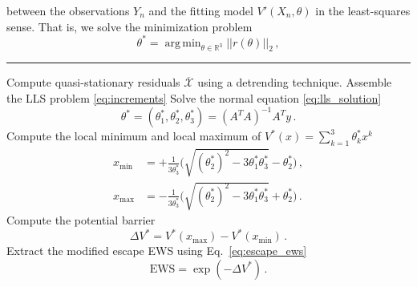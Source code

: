 \documentclass[a4paper,fleqn]{cas-sc}
\DeclareMathOperator*{\argmin}{\arg\,min}
\begin{document}
%
between the observations $Y_n$ and the fitting model $V'(X_n,\theta)$ in the least-squares sense.
That is, we solve the minimization problem
%
\begin{equation}\label{eq:lls_problem}
        \theta^{*} = \argmin_{\theta\in \mathbb{R}^{3}}||r(\theta)||_{2}\,,
\end{equation}
%
\begin{algorithm}[!tp]
        \DontPrintSemicolon
        \SetAlgoNoLine
        \BlankLine 
        \BlankLine 
        \hrule
        \BlankLine
        \nl Compute quasi-stationary residuals $\overline{\mathcal{X}}$ using a detrending technique.
        \BlankLine
        \nl Assemble the LLS problem \eqref{eq:increments}\;
        \Indp{}
        \Indm\BlankLine
        \nl Solve the normal equation \eqref{eq:lls_solution}
        \begin{equation*}
                \theta^* = (\theta^*_1, \theta^*_2, \theta^*_3) = (A^TA)^{-1}A^Ty\,.
        \end{equation*}
        \BlankLine
        \nl Compute the local minimum and local maximum of $V^*(x)=\sum_{k=1}^{3}\theta_k^*x^k$
        \begin{align*}
                x_{\text{min}} &= + \frac{1}{3\theta^*_3}\bigg(\sqrt{(\theta_2^*)^2 - 3\theta_1^*\theta_3^*} - \theta^*_2\bigg)\,,\\
                x_{\text{max}} &= - \frac{1}{3\theta^*_3}\bigg(\sqrt{(\theta_2^*)^2 - 3\theta_1^*\theta_3^*} + \theta^*_2\bigg)\,.
        \end{align*}
        \BlankLine
        \nl Compute the potential barrier 
        \begin{equation*}
                \Delta V^*=V^*(x_{\text{max}}) - V^*(x_{\text{min}})\,.
        \end{equation*}
        \BlankLine
        \nl Extract the modified escape EWS using Eq.~\eqref{eq:escape_ews}
        \begin{equation*}
                \text{EWS} = \exp(-\Delta V^*)\,.
        \end{equation*}
        \vspace{-10pt}
        \caption{Extraction of the modified escape EWS from timeseries data.}
        \label{alg:modified_ews}
\end{algorithm}
\end{document}
